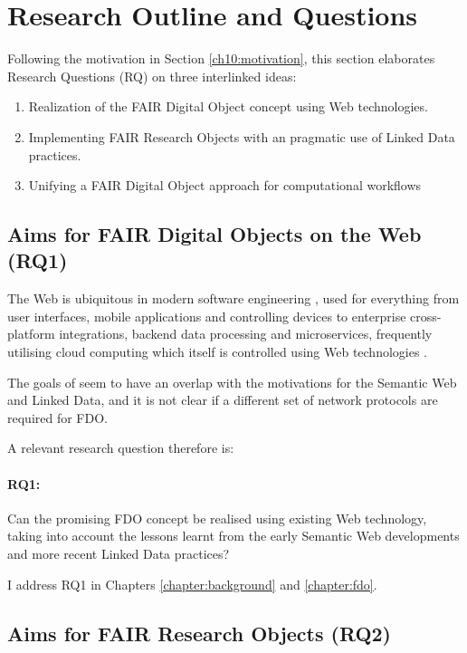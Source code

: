 

\section{Research Outline and Questions}
\label{intro:outline}

Following the motivation in Section \vref{ch10:motivation}, this section elaborates Research Questions (RQ) on three interlinked ideas:

\begin{enumerate}
    \item Realization of the FAIR Digital Object concept using Web technologies.
    \item Implementing FAIR Research Objects with an pragmatic use of Linked Data practices.
    \item Unifying a FAIR Digital Object approach for computational workflows
\end{enumerate}


\subsection{Aims for FAIR Digital Objects on the Web (RQ1)}
\label{intro:rq1}

The Web is ubiquitous in modern software engineering \cite{Taivalsaari 2021}, used for everything from user interfaces, mobile applications and controlling devices to enterprise cross-platform integrations, backend data processing and microservices, frequently utilising cloud computing which itself is controlled using Web technologies \cite{Marinescu 2023}.

The goals of  seem to have an overlap with the motivations for the Semantic Web and Linked Data, and it is not clear if a different set of network protocols are required for FDO.

A relevant research question therefore is: 

\paragraph{RQ1:}\label{rq1} 
Can the promising FDO concept be realised using existing Web technology, taking into account the lessons learnt from the early Semantic Web developments and more recent Linked Data practices?

I address RQ1 in Chapters \ref{chapter:background} and \ref{chapter:fdo}.


\subsection{Aims for FAIR Research Objects (RQ2)}
\label{intro:rq2}

